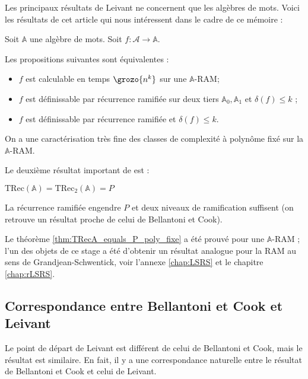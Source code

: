 \documentclass{report}
\newcommand{\bbA}{\mathbb{A}}
\newcommand{\TRec}[1]{\text{TRec}\left(\mathbb{#1}\right)}
\newcommand{\TRecd}[1]{\text{TRec}_{2}\left(\mathbb{#1}\right)}
\begin{document}
			\espace
			
			Les principaux résultats de Leivant ne concernent que les algèbres de mots. Voici les résultats de cet article \cite{Leivant1995} qui nous intéressent dans le cadre de ce mémoire :
			
			\begin{theorem}
				\label{thm:TRecA_equals_P_poly_fixe}
				Soit $\bbA$ une algèbre de mots. Soit $f : \mathcal{A} \to \bbA $.
				
				Les propositions suivantes sont équivalentes :
	
				\begin{itemize}[itemsep=-1mm]
					\item 	$f$ est calculable en temps $\grozo{n^k}$ sur une $\bbA$-RAM;
					\item 	$f$ est définissable par récurrence ramifiée sur deux tiers $\bbA_0, \bbA_1$ et $\delta(f) \leq k$ ;
					\item 	$f$ est définissable par récurrence ramifiée et $\delta(f) \leq k$.
				\end{itemize}
			\end{theorem}
			
			On a une caractérisation très fine des classes de complexité à polynôme fixé sur la $\bbA$-RAM.
			
			Le deuxième résultat important de \cite{Leivant1995} est :
			
			\begin{theorem}
				\label{thm:TRecA_equals_P}
				$\TRec{A} = \TRecd{A} = P$
			\end{theorem}
			
			La récurrence ramifiée engendre $P$ et deux niveaux de ramification suffisent (on retrouve un résultat proche de celui de Bellantoni et Cook).
		
			Le théorème \ref{thm:TRecA_equals_P_poly_fixe} a été prouvé pour une $\bbA$-RAM ; l'un des objets de ce stage a été d'obtenir un résultat analogue pour la RAM au sens de Grandjean-Schwentick, voir l'annexe \ref{chap:LSRS} et le chapitre \ref{chap:rLSRS}.
			
		
	
		\subsection{Correspondance entre Bellantoni et Cook et Leivant}
		\label{subsec:corres_BC_Leivant}
	
			Le point de départ de Leivant est différent de celui de Bellantoni et Cook, mais le résultat est similaire. En fait, il y a une correspondance naturelle entre le résultat de Bellantoni et Cook et celui de Leivant.
			
\end{document}
